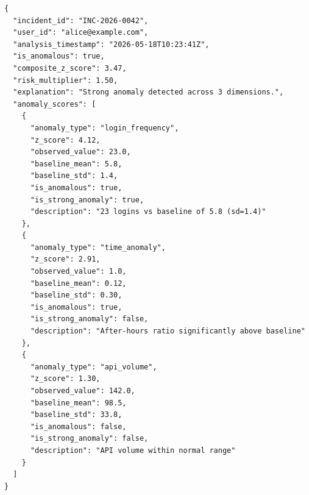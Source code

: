 \documentclass[12pt,a4paper]{article}
\begin{document}
\begin{lstlisting}[style=yamlstyle, caption=Full anomaly detection JSON response]
{
  "incident_id": "INC-2026-0042",
  "user_id": "alice@example.com",
  "analysis_timestamp": "2026-05-18T10:23:41Z",
  "is_anomalous": true,
  "composite_z_score": 3.47,
  "risk_multiplier": 1.50,
  "explanation": "Strong anomaly detected across 3 dimensions.",
  "anomaly_scores": [
    {
      "anomaly_type": "login_frequency",
      "z_score": 4.12,
      "observed_value": 23.0,
      "baseline_mean": 5.8,
      "baseline_std": 1.4,
      "is_anomalous": true,
      "is_strong_anomaly": true,
      "description": "23 logins vs baseline of 5.8 (sd=1.4)"
    },
    {
      "anomaly_type": "time_anomaly",
      "z_score": 2.91,
      "observed_value": 1.0,
      "baseline_mean": 0.12,
      "baseline_std": 0.30,
      "is_anomalous": true,
      "is_strong_anomaly": false,
      "description": "After-hours ratio significantly above baseline"
    },
    {
      "anomaly_type": "api_volume",
      "z_score": 1.30,
      "observed_value": 142.0,
      "baseline_mean": 98.5,
      "baseline_std": 33.8,
      "is_anomalous": false,
      "is_strong_anomaly": false,
      "description": "API volume within normal range"
    }
  ]
}
\end{lstlisting}
\end{document}

